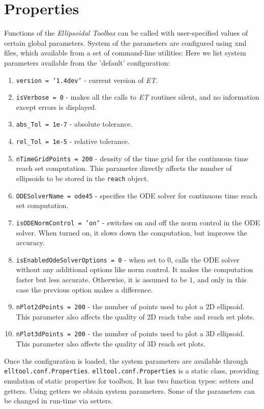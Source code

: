 \section{Properties}
Functions of the {\it Ellipsoidal Toolbox} can be called with
user-specified values of certain global parameters. System of the parameters
are configured using xml files, which  available from a set of command-line
utilities:
Here we list system parameters available from the 'default' configuration:
\begin{enumerate}
\item {\tt version = '1.4dev'} - current version of {\it ET}.
\item {\tt isVerbose = 0} - makes all the calls to {\it ET}
routines silent, and no information except errors is displayed.
\item {\tt abs\_Tol = 1e-7} - absolute tolerance.
\item {\tt rel\_Tol = 1e-5} - relative tolerance.
\item {\tt nTimeGridPoints = 200} - density of the time grid for the
continuous time reach set computation.
This parameter directly affects the number of ellipsoids to
be stored in the {\tt reach} object.
\item {\tt ODESolverName = ode45} - specifies the ODE solver for continuous time
reach set computation.
\item {\tt isODENormControl = 'on'} - switches on and off the norm control
in the ODE solver. When turned on, it slows down the computation, but improves
the accuracy.
\item {\tt isEnabledOdeSolverOptions = 0} - when set to $0$, calls the ODE solver
without any additional options like norm control. It makes the computation
faster but less accurate. Otherwise, it is assumed to be $1$, and only in this
case the previous option makes a difference.
\item {\tt nPlot2dPoints = 200} - the number of points used to plot a
2D ellipsoid. This parameter also affects the quality of 2D reach tube
and reach set plots.
\item {\tt nPlot3dPoints = 200} - the number of points used to plot
a 3D ellipsoid. This parameter also affects the quality of 3D reach set plots.
\end{enumerate}
Once the configuration is loaded, the system parameters are available through
{\tt elltool.conf.Properties}.
{\tt elltool.conf.Properties} is a static class, providing emulation of static
properties for toolbox. It has two function types: setters and getters.
Using getters we obtain system parameters.
 Some of the parameters can be changed
in run-time via setters.




